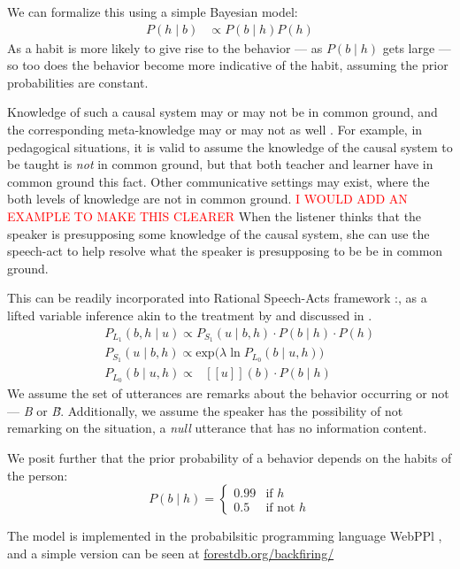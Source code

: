\documentclass[10pt,letterpaper]{article}
\newcommand{\denote}[1]{\mbox{ $[\![ #1 ]\!]$}}
\newcommand{\red}[1]{\textcolor{Red}{#1}}
\begin{document}
We can formalize this using a simple Bayesian model:
\begin{align*}
P(h \mid b) & \propto P(b \mid h) P(h) 
\end{align*}
As a habit is more likely to give rise to the behavior --- as $P(b \mid h)$ gets large --- so too does the behavior become more indicative of the habit, assuming the prior probabilities are constant. 

Knowledge of such a causal system may or may not be in common ground, and the corresponding meta-knowledge may or may not as well \cite{Clark1977, Clark1996}. 
For example, in pedagogical situations, it is valid to assume the knowledge of the causal system to be taught is \emph{not} in common ground, but that both teacher and learner have in common ground this fact.
Other communicative settings may exist, where the both levels of knowledge are not in common ground.  \red{I WOULD ADD AN EXAMPLE TO MAKE THIS CLEARER}
When the listener thinks that the speaker is presupposing some knowledge of the causal system, she can use the speech-act to help resolve what the speaker is presupposing to be be in common ground.

This can be readily incorporated into Rational Speech-Acts framework \cite{Frank2012, Goodman2013}:, as a lifted variable inference akin to the treatment by \cite{Degen2015} and discussed in .
%
\begin{eqnarray}
&&P_{L_1}(b, h \mid u)\propto P_{S_1}(u \mid b, h)\cdot P(b \mid h) \cdot P(h) \label{eq:L1}\\
&&P_{S_1}(u \mid b, h) \propto \mathrm{exp}({\lambda \ln P_{L_0}(b \mid u, h))} \label{eq:S1}\\
&&P_{L_0}(b \mid u, h)\propto \denote{u}(b) \cdot P(b \mid h) \label{eq:L0}
\end{eqnarray}
%
We assume the set of utterances are remarks about the behavior occurring or not --- \emph{B} or \emph{\~B}. 
Additionally, we assume the speaker has the possibility of not remarking on the situation, a \emph{null} utterance that has no information content.  

We posit further that the prior probability of a behavior depends on the habits of the person:
$$
P(b \mid h) = \begin{cases}
0.99  & \text{if } h\\
0.5  & \text{if not } h
\end{cases}
$$

The model is implemented in the probabilsitic programming language WebPPl \cite{dippl}, and a simple version can be seen at \url{forestdb.org/backfiring/}
\end{document}
